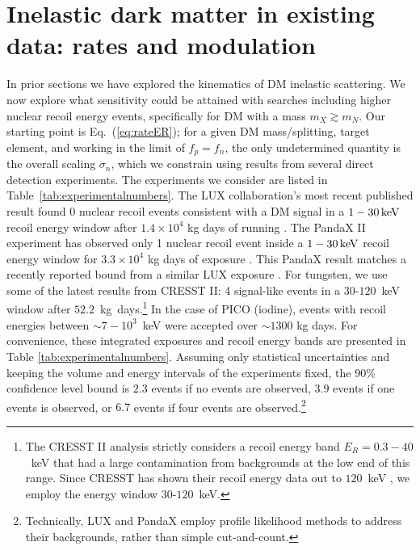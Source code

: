 \documentclass[11pt]{article}
\newcommand{\kev}{{\rm keV}}
\begin{document}
\section{Inelastic dark matter in existing data: rates and modulation}
\label{sec:prosp}

In prior sections we have explored the kinematics of DM inelastic scattering. We now explore what sensitivity could be attained with searches including higher nuclear recoil energy events, specifically for DM with a mass $m_X \gtrsim m_N$.  Our starting point is Eq.~(\ref{eq:rateER}); for a given DM mass/splitting, target element, and working in the limit of $f_p = f_n$, the only undetermined quantity is the overall scaling $\sigma_n$, which we constrain using results from several direct detection experiments. 
The experiments we consider are listed in Table~\ref{tab:experimentalnumbers}. The LUX collaboration's most recent published result found 0 nuclear recoil events consistent with a DM signal in a $1-30\, \kev$ recoil energy window after $1.4 \times 10^4$ kg days of running \cite{Akerib:2015rjg}. The PandaX II experiment has observed only 1 nuclear recoil event inside a $1-30\, \kev$ recoil energy window for $3.3 \times 10^4$ kg days of exposure \cite{Tan:2016zwf}. This PandaX result matches a recently reported bound from a similar LUX exposure \cite{LUXtalk}. For tungsten, we use some of the latest results from CRESST II: 4 signal-like events in a $30$-$120$~keV window after $52.2$~kg~days.\footnote{The CRESST II analysis strictly considers a recoil energy band $E_R = 0.3-40$~keV that had a large contamination from backgrounds at the low end of this range.  Since CRESST has shown their recoil energy data out to $120$~keV \cite{Angloher:2015ewa}, we employ the energy window $30$-$120$~keV\@.}  In the case of PICO \cite{Amole:2015pla} (iodine), events with recoil energies between $\sim 7-10^3$~keV were accepted over $\sim 1300$ kg days. For convenience, these integrated exposures and recoil energy bands are presented in Table \ref{tab:experimentalnumbers}. Assuming only statistical uncertainties and keeping the volume and energy intervals of the experiments fixed, the $90\%$ confidence level bound is $2.3$ events if no events are observed, $3.9$ events if one events is observed, or $6.7$ events if four events are observed.\footnote{Technically, LUX and PandaX employ profile likelihood methods to address their backgrounds, rather than simple cut-and-count.}
\end{document}
